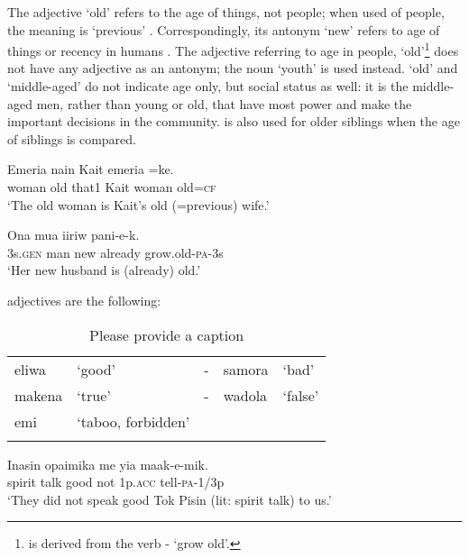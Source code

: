  The adjective  `old' refers to the age of things, not people; when used of people, the meaning is `previous' . Correspondingly, its antonym  `new' refers to age of things or recency in humans . The adjective referring to age in people,  `old'\footnote{ is derived from the verb - `grow old'.} does not have any adjective as an antonym; the noun  `youth' is used instead.  `old' and  `middle-aged' do not indicate age only, but social status as well: it is the middle-aged men, rather than young or old, that have most power and make the important decisions in the community.  is also used for older siblings when the age of siblings is compared.

\ea%
\label{ex:3:x74}
\gll Emeria  nain Kait emeria =ke. \\
woman old that1 Kait woman old=\textsc{cf}\\
\glt`The old woman is Kait's old (=previous) wife.'
\z

\ea%
\label{ex:3:x75}
\gll Ona mua  iiriw pani-e-k. \\
3s.\textsc{gen} man new already grow.old-\textsc{pa}-3s\\
\glt`Her new husband is (already) old.'
\z

 adjectives are the following: 

\begin{table}
\caption{Please provide a caption}
\label{}
\begin{tabular}{llcll}
\mytoprule
eliwa &`good' &- &samora &`bad'\\
makena &`true' &- &wadola &`false'\\
emi &`taboo, forbidden'\\
\mybottomrule
\end{tabular}
\end{table}

\ea%
\label{ex:3:x1760}
\gll Inasin opaimika  me yia maak-e-mik. \\
spirit talk good not 1p.\textsc{acc} tell-\textsc{pa}-1/3p\\
\glt`They did not speak good Tok Pisin (lit: spirit talk) to us.'
\z

